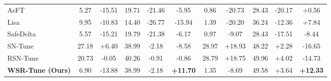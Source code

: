 \documentclass{article}
\begin{document}
\begin{table}[t]
{\begin{tabular}{lccccc|ccccc}
AsFT
& 5.27 & -15.51 & 19.71 & -21.46 & -5.95
& 0.86 & -20.73 & 28.43 & -20.17 & +0.56 \\

Lisa
& 9.95 & -10.83 & 14.40 & -26.77 & -15.94
& 1.39 & -20.20 & 36.24 & -12.36 & +7.84 \\

SafeDelta
& 5.57 &  -15.21  & 19.79 & -21.38 & -6.17
& 0.97 &  -9.07  & 28.43 & -17.51 & -8.44 \\

SN-Tune
& 27.18 & +6.40 & 38.99 &  -2.18  & -8.58
& 28.97 & +18.93 & 48.22 & +2.28 & -16.65 \\

RSN-Tune
& 20.73 & -0.05 & 40.26 & -0.91 & -0.86
& 28.79 & +18.75 & 49.96 &  +4.02 & -14.73 \\


\textbf{WSR-Tune (Ours)}
& 6.90 & -13.88 & 38.99 &  -2.18 & \cellcolor{green!20}\textbf{+11.70}
& 1.35 &  -8.69  & 49.58 &  +3.64  & \cellcolor{green!20} \textbf{+12.33} \\














\end{tabular}}
\end{table}
\end{document}

